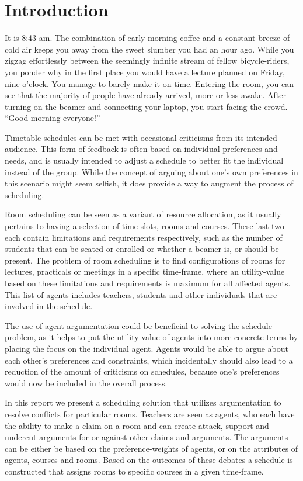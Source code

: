 \section{Introduction}
It is 8:43 am. The combination of early-morning coffee and a constant
breeze of cold air keeps you away from the sweet slumber you had an hour
ago. While you zigzag effortlessly between the seemingly infinite stream
of fellow bicycle-riders, you ponder why in the first place you would have
a lecture planned on Friday, nine o'clock. You manage to barely make it on
time. Entering the room, you can see that the majority of people have
already arrived, more or less awake. After turning on the beamer and
connecting your laptop, you start facing the crowd. ``Good morning
everyone!''

Timetable schedules can be met with occasional criticisms from its intended
audience. This form of feedback is often based on individual preferences
and needs, and is usually intended to adjust a schedule to better fit the
individual instead of the group. While the concept of arguing about one's
own preferences in this scenario might seem selfish, it does provide a way
to augment the process of scheduling.

Room scheduling can be seen as a variant of resource allocation, as it
usually pertains to having a selection of time-slots, rooms and courses.
These last two each contain limitations and requirements respectively, such
as the number of students that can be seated or enrolled or whether a
beamer is, or should be present. The problem of room scheduling is to find
configurations of rooms for lectures, practicals or meetings in a specific
time-frame, where an utility-value based on these limitations and
requirements is maximum for all affected agents. This list of agents
includes teachers, students and other individuals that are involved in the
schedule.            

The use of agent argumentation could be beneficial to solving the schedule
problem, as it helps to put the utility-value of agents into more concrete
terms by placing the focus on the individual agent. Agents would be able to
argue about each other's preferences and constraints, which incidentally
should also lead to a reduction of the amount of criticisms on schedules,
because one's preferences would now be included in the overall process. 

In this report we present a scheduling solution that utilizes argumentation 
to resolve conflicts for particular rooms. Teachers are seen as agents, who 
each have the ability to make a claim on a room and can create attack, 
support and undercut arguments for or against other claims and arguments. 
The arguments can be either be based on the preference-weights of agents, 
or on the attributes of agents, courses and rooms. Based on the outcomes of 
these debates a schedule is constructed that assigns rooms to specific 
courses in a given time-frame.
